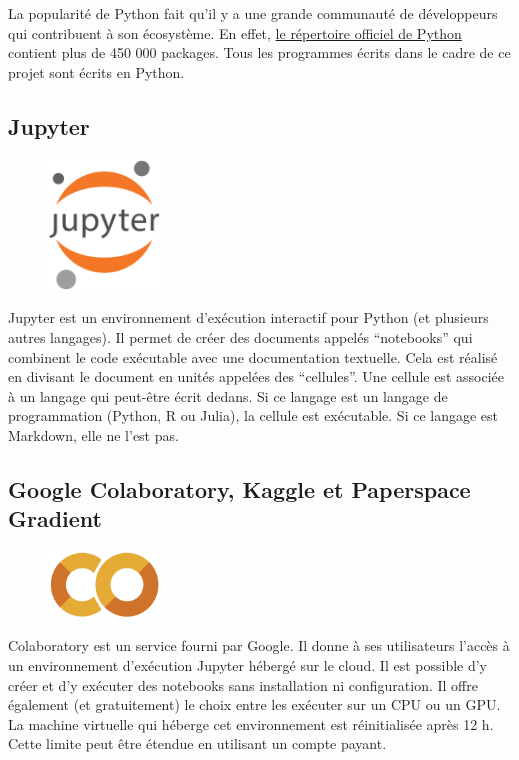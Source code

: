 La popularité de Python fait qu'il y a une grande communauté de développeurs qui contribuent à son écosystème.
En effet, \href{https://pypi.or}{le répertoire officiel de Python} contient plus de 450 000 packages.
Tous les programmes écrits dans le cadre de ce projet sont écrits en Python.

\subsection{Jupyter}%
\label{subsec.jupyter}

\begin{figure}
    \vspace*{-\topsep}
    \begin{flushright}
        \includegraphics[width=3cm]{assets/images/jupyter.png}
    \end{flushright}
\end{figure}
Jupyter est un environnement d'exécution interactif pour Python (et plusieurs autres langages).
Il permet de créer des documents appelés ``notebooks'' 
qui combinent le code exécutable avec une documentation textuelle.
Cela est réalisé en divisant le document en unités appelées des ``cellules''.
Une cellule est associée à un langage qui peut-être écrit dedans.
Si ce langage est un langage de programmation (Python, R ou Julia), la cellule est exécutable.
Si ce langage est Markdown, elle ne l'est pas.


\subsection{Google Colaboratory, Kaggle et Paperspace Gradient}%
\label{subsec.colab}

\begin{figure}
    \vspace*{-\topsep}
    \begin{flushright}
        \includegraphics[width=3cm]{assets/images/colab.png}
    \end{flushright}
\end{figure}
Colaboratory est un service fourni par Google.
Il donne à ses utilisateurs l'accès à un environnement d'exécution Jupyter hébergé sur le cloud.
Il est possible d'y créer et d'y exécuter des notebooks sans installation ni configuration.
Il offre également (et gratuitement) le choix entre les exécuter sur un CPU ou un GPU.
La machine virtuelle qui héberge cet environnement est réinitialisée après 12 h.
Cette limite peut être étendue en utilisant un compte payant.

